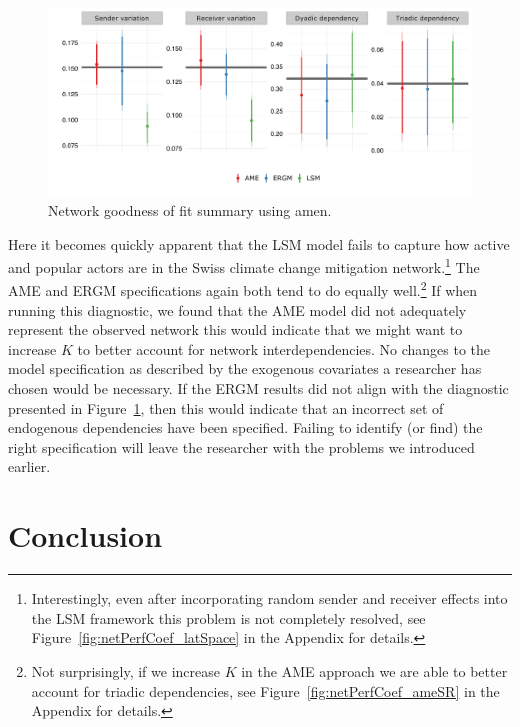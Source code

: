 \documentclass[12pt,pdflatex]{elsarticle}
\newcommand{\pkg}[1]{{\fontseries{b}\selectfont #1}}
\begin{document}
\begin{figure}[ht]
	\centering
	\includegraphics[width=1\textwidth]{netPerfCoef}
	\caption{Network goodness of fit summary using \pkg{amen}.}
	\label{fig:ergmAmePerf}
\end{figure}
\FloatBarrier

Here it becomes quickly apparent that the LSM model fails to capture how active and popular actors are in the Swiss climate change mitigation network.\footnote{Interestingly, even after incorporating random sender and receiver effects into the LSM framework this problem is not completely resolved, see Figure~\ref{fig:netPerfCoef_latSpace} in the Appendix for details.} The AME and ERGM specifications again both tend to do equally well.\footnote{Not surprisingly, if we increase $K$ in the AME approach we are able to better account for triadic dependencies, see Figure~\ref{fig:netPerfCoef_ameSR} in the Appendix for details.} If when running this diagnostic, we found that the AME model did not adequately represent the observed network this would indicate that we might want to increase $K$ to better account for network interdependencies. No changes to the model specification as described by the exogenous covariates a researcher has chosen would be necessary. If the ERGM results did not align with the diagnostic presented in Figure~\ref{fig:ergmAmePerf}, then this would indicate that an incorrect set of endogenous dependencies have been specified. Failing to identify (or find) the right specification will leave the researcher with the problems we introduced earlier.

\section{\textbf{Conclusion}}
\end{document}

